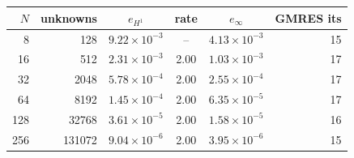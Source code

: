 \begin{tabular}{rr cc cr}
\toprule
$N$ & unknowns & $e_{H^1}$ & rate & $e_\infty$ & GMRES its\\
\midrule
8 & 128 & $9.22{\times}10^{-3}$ & -- & $4.13{\times}10^{-3}$ & 15\\
16 & 512 & $2.31{\times}10^{-3}$ & 2.00 & $1.03{\times}10^{-3}$ & 17\\
32 & 2048 & $5.78{\times}10^{-4}$ & 2.00 & $2.55{\times}10^{-4}$ & 17\\
64 & 8192 & $1.45{\times}10^{-4}$ & 2.00 & $6.35{\times}10^{-5}$ & 17\\
128 & 32768 & $3.61{\times}10^{-5}$ & 2.00 & $1.58{\times}10^{-5}$ & 16\\
256 & 131072 & $9.04{\times}10^{-6}$ & 2.00 & $3.95{\times}10^{-6}$ & 15\\
\bottomrule
\end{tabular}
